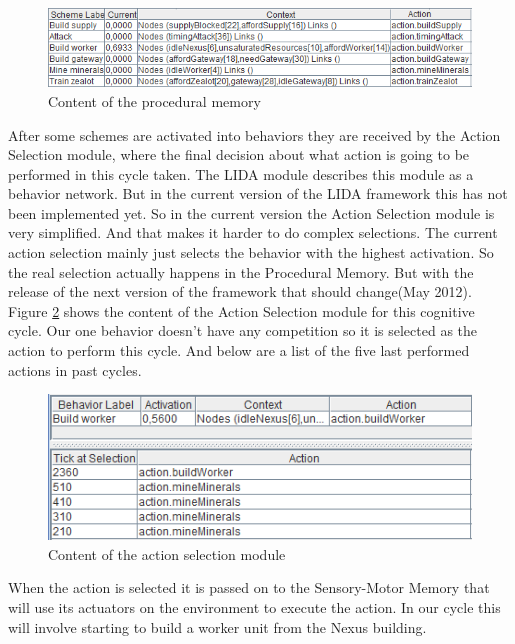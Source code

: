 \begin{figure}[h!tb]
\centering
\includegraphics[scale=1.0]{graphics/procedural_memory.png}
\caption{Content of the procedural memory}
\label{fig:proceduralmemory}
\end{figure}

After some schemes are activated into behaviors they are received by the Action Selection module, where the final decision about what action is going to be performed in this cycle taken. The LIDA module describes this module as a behavior network\cite{maes1989right}. But in the current version of the LIDA framework this has not been implemented yet. So in the current version the Action Selection module is very simplified. And that makes it harder to do complex selections. The current action selection mainly just selects the behavior with the highest activation. So the real selection actually happens in the Procedural Memory. But with the release of the next version of the framework that should change(May 2012). Figure \ref{fig:actionselection} shows the content of the Action Selection module for this cognitive cycle. Our one behavior doesn't have any competition so it is selected as the action to perform this cycle. And below are a list of the five last performed actions in past cycles. 
\begin{figure}[h!tb]
\centering
\includegraphics[scale=1.0]{graphics/action_selection.png}
\caption{Content of the action selection module}
\label{fig:actionselection}
\end{figure}

When the action is selected it is passed on to the Sensory-Motor Memory that will use its actuators on the environment to execute the action. In our cycle this will involve starting to build a worker unit from the Nexus building. 